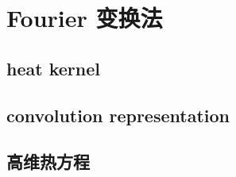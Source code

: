 \section{Fourier 变换法}
\label{b2:sec:1202}


\subsection{heat kernel}
\label{b2:subsec:120201}

\subsection{convolution representation}
\label{b2:subsec:120202}

\subsection{高维热方程}
\label{b2:subsec:120203}


